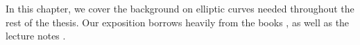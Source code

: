 





In this chapter, we cover the background on elliptic curves needed throughout the rest of the thesis. Our exposition borrows heavily from the books \citep{Silverman,Washington}, as well as the lecture notes \citep{Sutherland}.














